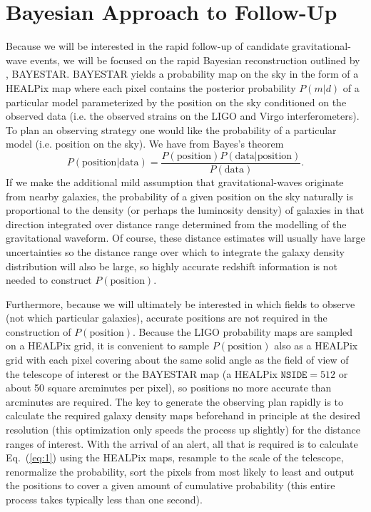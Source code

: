 \documentclass[useAMS,usenatbib]{mn2e}
\begin{document}
\section{Bayesian Approach to Follow-Up}

Because we will be interested in the rapid follow-up of candidate
gravitational-wave events, we will be focused on the rapid Bayesian
reconstruction outlined by \citet{2015arXiv150803634S}, BAYESTAR. 
BAYESTAR yields a probability map on the sky in
the form of a HEALPix map \citep{2005ApJ...622..759G} where each pixel
contains the posterior probability $P(m|d)$ of a particular model
parameterized by the position on the sky conditioned on the observed
data (i.e. the observed strains on the LIGO and Virgo
interferometers).  To plan an observing strategy one would like the
probability of a particular model (i.e. position on the sky).
We have from Bayes's theorem
\begin{equation}
  P(\mathrm{position}|\mathrm{data}) = \frac{P(\mathrm{position})
    P(\mathrm{data}|\mathrm{position})}{P(\mathrm{data})}.
  \label{eq:1}
\end{equation}
If we make the additional mild assumption that gravitational-waves
originate from nearby galaxies, the probability of a given position on
the sky naturally is proportional to the density (or perhaps the
luminosity density) of galaxies in that direction integrated over
distance range determined from the modelling of the gravitational
waveform.  Of course, these distance estimates will usually have large
uncertainties so the distance range over which to integrate the
galaxy density distribution will also be large, so highly accurate
redshift information is not needed to construct
$P(\mathrm{position})$.

Furthermore, because we will ultimately be interested in which fields
to observe (not which particular galaxies), accurate positions are not
required in the construction of $P(\mathrm{position})$. Because the
LIGO probability maps are sampled on a HEALPix grid, it is convenient 
to sample $P(\mathrm{position})$ also as a HEALPix grid with each pixel
covering about the same solid angle as the field of view of the
telescope of interest or the BAYESTAR map (a HEALPix $\mathtt{NSIDE}=512$ or
about 50 square arcminutes per pixel), so positions no more accurate
than arcminutes are required.  The key to generate the observing plan
rapidly is to calculate the required galaxy density maps beforehand in
principle at the desired resolution (this optimization only speeds the
process up slightly) for the distance ranges of interest.  With the
arrival of an alert, all that is required is to calculate
Eq.~(\ref{eq:1}) using the HEALPix maps, resample to the scale of the
telescope, renormalize the probability, sort the pixels from most
likely to least and output the positions to cover a given amount of
cumulative probability (this entire process takes typically less than
one second).
\end{document}
